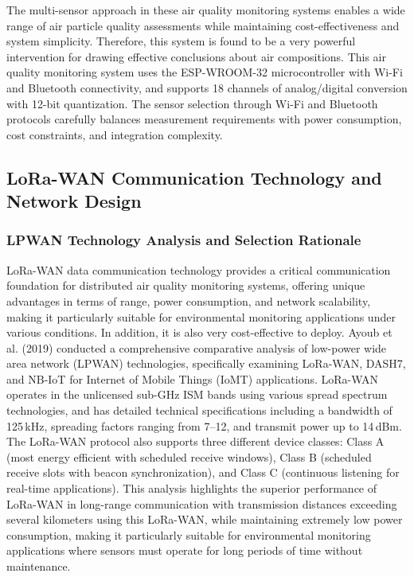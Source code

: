 \documentclass[conference]{IEEEtran}
\begin{document}
The multi-sensor approach in these air quality monitoring systems enables a wide range of air particle quality assessments while maintaining cost-effectiveness and system simplicity. Therefore, this system is found to be a very powerful intervention for drawing effective conclusions about air compositions. This air quality monitoring system uses the ESP-WROOM-32 microcontroller with Wi-Fi and Bluetooth connectivity, and supports 18 channels of analog/digital conversion with 12-bit quantization. The sensor selection through Wi-Fi and Bluetooth protocols carefully balances measurement requirements with power consumption, cost constraints, and integration complexity.~\cite{meraz2020}

\subsection{LoRa-WAN Communication Technology and Network Design}
\subsubsection{LPWAN Technology Analysis and Selection Rationale}
LoRa-WAN data communication technology provides a critical communication foundation for distributed air quality monitoring systems, offering unique advantages in terms of range, power consumption, and network scalability, making it particularly suitable for environmental monitoring applications under various conditions. In addition, it is also very cost-effective to deploy. Ayoub et al. (2019) conducted a comprehensive comparative analysis of low-power wide area network (LPWAN) technologies, specifically examining LoRa-WAN, DASH7, and NB-IoT for Internet of Mobile Things (IoMT) applications. LoRa-WAN operates in the unlicensed sub-GHz ISM bands using various spread spectrum technologies, and has detailed technical specifications including a bandwidth of 125\,kHz, spreading factors ranging from 7--12, and transmit power up to 14\,dBm. The LoRa-WAN protocol also supports three different device classes: Class A (most energy efficient with scheduled receive windows), Class B (scheduled receive slots with beacon synchronization), and Class C (continuous listening for real-time applications). This analysis highlights the superior performance of LoRa-WAN in long-range communication with transmission distances exceeding several kilometers using this LoRa-WAN, while maintaining extremely low power consumption, making it particularly suitable for environmental monitoring applications where sensors must operate for long periods of time without maintenance.~\cite{ayoub2019}
\end{document}
